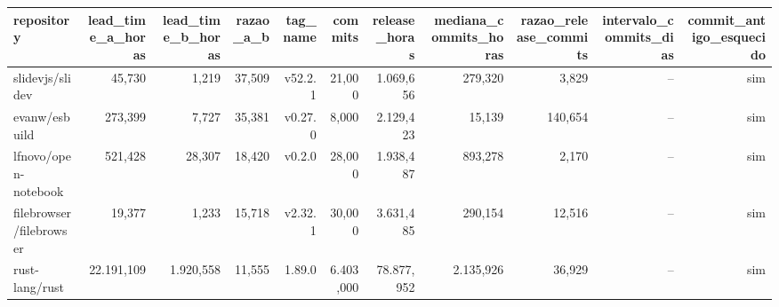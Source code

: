 \begin{tabular}{lrrrrrrrrrr}
\hline
repository & lead\_time\_a\_horas & lead\_time\_b\_horas & razao\_a\_b & tag\_name & commits & release\_horas & mediana\_commits\_horas & razao\_release\_commits & intervalo\_commits\_dias & commit\_antigo\_esquecido \\
\hline
slidevjs/slidev & 45,730 & 1,219 & 37,509 & v52.2.1 & 21,000 & 1.069,656 & 279,320 & 3,829 & -- & sim \\
evanw/esbuild & 273,399 & 7,727 & 35,381 & v0.27.0 & 8,000 & 2.129,423 & 15,139 & 140,654 & -- & sim \\
lfnovo/open-notebook & 521,428 & 28,307 & 18,420 & v0.2.0 & 28,000 & 1.938,487 & 893,278 & 2,170 & -- & sim \\
filebrowser/filebrowser & 19,377 & 1,233 & 15,718 & v2.32.1 & 30,000 & 3.631,485 & 290,154 & 12,516 & -- & sim \\
rust-lang/rust & 22.191,109 & 1.920,558 & 11,555 & 1.89.0 & 6.403,000 & 78.877,952 & 2.135,926 & 36,929 & -- & sim \\
\hline
\end{tabular}
